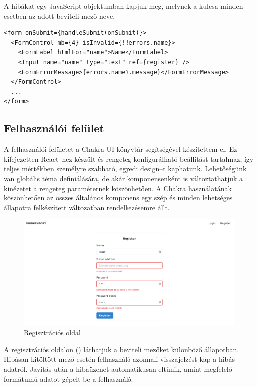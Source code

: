 A hibákat egy JavaScript objektumban kapjuk meg, melynek a kulcsa minden esetben az adott beviteli mező neve.

\begin{lstlisting}[style=ES6]
<form onSubmit={handleSubmit(onSubmit)}>
  <FormControl mb={4} isInvalid={!!errors.name}>
    <FormLabel htmlFor="name">Name</FormLabel>
    <Input name="name" type="text" ref={register} />
    <FormErrorMessage>{errors.name?.message}</FormErrorMessage>
  </FormControl>
  ...
</form>
\end{lstlisting}


\subsection{Felhasználói felület}
A felhasználói felületet a Chakra UI\cite{ChakraUI} könyvtár segítségével készítettem el. Ez kifejezetten React–hez készült és rengeteg konfigurálható beállítást tartalmaz, így teljes mértékben személyre szabható, egyedi design–t kaphatunk. Lehetőségünk van globális téma definiálására, de akár komponensenként is változtathatjuk a kinézetet a rengeteg paraméternek köszönhetően.
A Chakra használatának köszönhetően az összes általános komponens egy szép és minden lehetséges állapotra felkészített változatban rendelkezésemre állt.

\begin{figure}[!ht]
  \centering
  \includegraphics[width=150mm, keepaspectratio]{figures/reg.png}
  \caption{Regisztrációs oldal}
  \label{fig:reg}
\end{figure}

A regisztrációs oldalon () láthatjuk a beviteli mezőket különböző állapotban.
Hibásan kitöltött mező esetén felhasználó azonnali visszajelzést kap a hibás adatról.
Javítás után a hibaüzenet automatikusan eltűnik, amint megfelelő formátumú adatot gépelt be a felhasználó.

